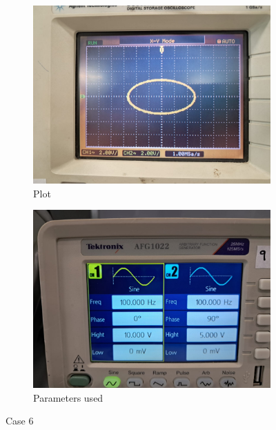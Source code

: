 \documentclass[a4paper,12pt]{article}
\begin{document}
\begin{figure}[htbp]
    \centering
    \begin{subfigure}[b]{0.45\textwidth}
        \centering
        \includegraphics[width=\linewidth]{figs/6/plot6.jpeg}
        \caption{Plot}
        \label{fig:image1}
    \end{subfigure}
    \hfill
    \begin{subfigure}[b]{0.45\textwidth}
        \centering
        \includegraphics[width=\linewidth]{figs/6/para6.jpeg}
        \caption{Parameters used}
        \label{fig:image2}
    \end{subfigure}
    \caption{Case 6}
    \label{fig:sidebyside}
\end{figure}
\end{document}
